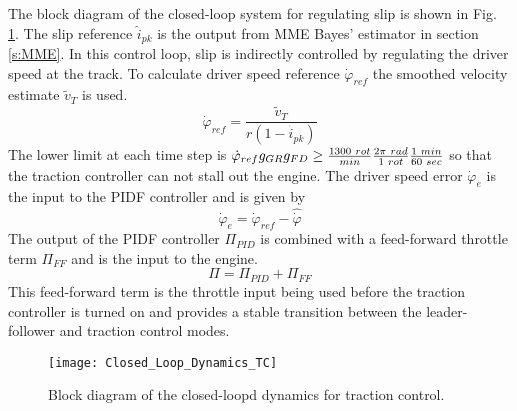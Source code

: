 The block diagram of the closed-loop system for regulating slip is shown in Fig. \ref{fig:Closed_Loop_Dynamics_TC}. The slip reference $\hat{i}_{pk}$ is the output from MME Bayes' estimator in section \ref{s:MME}. In this control loop, slip is indirectly controlled by regulating the driver speed at the track. To calculate driver speed reference $\dot\varphi_{ref}$ the smoothed velocity estimate $\tilde{v}_T$ is used. 
\begin{equation}
    \dot\varphi_{ref} = \frac{\tilde{v}_T}{r(1-\hat{i}_{pk})}
\end{equation}
The lower limit at each time step is $\dot{\varphi}_{ref}g_{GR}g_{FD} \geq \frac{1300\hspace{1mm} rot}{min}\frac{2\pi\hspace{1mm}rad}{1\hspace{1mm}rot}\frac{1\hspace{1mm}min}{60\hspace{1mm}sec}$ so that the traction controller can not stall out the engine. 
The driver speed error $\dot{\varphi}_e$ is the input to the PIDF controller and is given by
\begin{equation}
    \dot\varphi_e = \dot\varphi_{ref} - \hat{\dot\varphi}
\end{equation}
The output of the PIDF controller $\Pi_{PID}$ is combined with a feed-forward throttle term $\Pi_{FF}$ and is the input to the engine.
\begin{equation}
    \Pi = \Pi_{PID} + \Pi_{FF}
\end{equation}
This feed-forward term is the throttle input being used before the traction controller is turned on and provides a stable transition between the leader-follower and traction control modes. 
\begin{figure}[b]
    \centering
    \texttt{[image: Closed\_Loop\_Dynamics\_TC]}
    \caption{Block diagram of the closed-loopd dynamics for traction control.}
    \label{fig:Closed_Loop_Dynamics_TC}
\end{figure}

